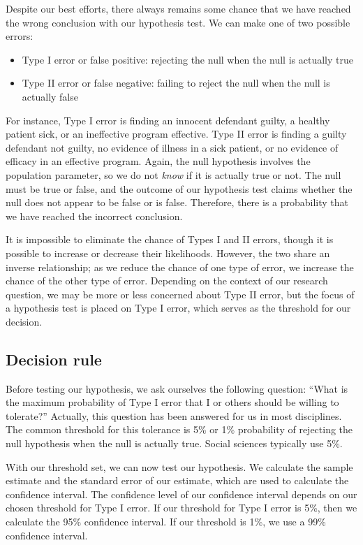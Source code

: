 \documentclass[
]{book}
\providecommand{\tightlist}{%
  \setlength{\itemsep}{0pt}\setlength{\parskip}{0pt}}
\begin{document}
Despite our best efforts, there always remains some chance that we have reached the wrong conclusion with our hypothesis test. We can make one of two possible errors:

\begin{itemize}
\tightlist
\item
  Type I error or false positive: rejecting the null when the null is actually true
\item
  Type II error or false negative: failing to reject the null when the null is actually false
\end{itemize}

For instance, Type I error is finding an innocent defendant guilty, a healthy patient sick, or an ineffective program effective. Type II error is finding a guilty defendant not guilty, no evidence of illness in a sick patient, or no evidence of efficacy in an effective program. Again, the null hypothesis involves the population parameter, so we do not \emph{know} if it is actually true or not. The null must be true or false, and the outcome of our hypothesis test claims whether the null does not appear to be false or is false. Therefore, there is a probability that we have reached the incorrect conclusion.

It is impossible to eliminate the chance of Types I and II errors, though it is possible to increase or decrease their likelihoods. However, the two share an inverse relationship; as we reduce the chance of one type of error, we increase the chance of the other type of error. Depending on the context of our research question, we may be more or less concerned about Type II error, but the focus of a hypothesis test is placed on Type I error, which serves as the threshold for our decision.

\hypertarget{decision-rule}{%
\subsection{Decision rule}\label{decision-rule}}

Before testing our hypothesis, we ask ourselves the following question: ``What is the maximum probability of Type I error that I or others should be willing to tolerate?'' Actually, this question has been answered for us in most disciplines. The common threshold for this tolerance is 5\% or 1\% probability of rejecting the null hypothesis when the null is actually true. Social sciences typically use 5\%.

With our threshold set, we can now test our hypothesis. We calculate the sample estimate and the standard error of our estimate, which are used to calculate the confidence interval. The confidence level of our confidence interval depends on our chosen threshold for Type I error. If our threshold for Type I error is 5\%, then we calculate the 95\% confidence interval. If our threshold is 1\%, we use a 99\% confidence interval.
\end{document}
